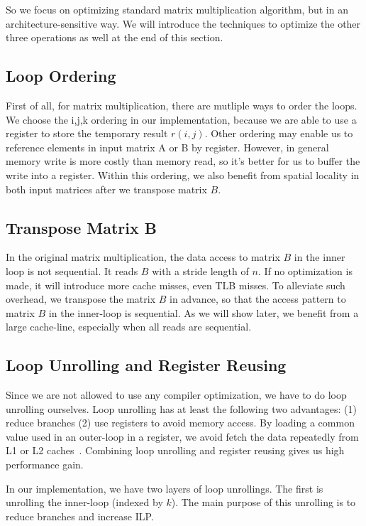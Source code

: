 \documentclass[twocolumn,letterpaper,10pt]{article}
\begin{document}
So we focus on optimizing standard matrix
multiplication algorithm, but in an architecture-sensitive way. We will introduce the techniques to
optimize the other three operations as well at the end of this
section.

\subsection{Loop Ordering}
First of all, for matrix multiplication, there are mutliple ways to order the
loops. We choose the i,j,k ordering in our implementation, because
we are able to use a register to store the temporary result
$r(i,j)$. Other ordering may enable us to reference elements in input
matrix A or B by register. However, in general memory write is more
costly than memory read, so it's better for us to buffer the
write into a register. Within this ordering, we also benefit from
spatial locality in both input matrices after we transpose matrix $B$.

\subsection{Transpose Matrix B}
In the original matrix multiplication, the data access to matrix $B$
in the inner loop is not sequential. It reads $B$ with a stride length
of $n$. If no optimization is made, it will
introduce more cache misses, even TLB misses. To alleviate such
overhead, we transpose the matrix $B$ in advance, so that the access pattern
to matrix $B$ in the inner-loop is sequential. As we will show later,
we benefit from a large cache-line, especially when all reads are sequential.

\subsection{Loop Unrolling and Register Reusing}
Since we are not allowed to use any compiler optimization, we have to
do loop unrolling ourselves. Loop unrolling has at least the following
two advantages: (1) reduce branches (2) use registers to avoid memory
access. By loading a common value used in an outer-loop in a register,
we avoid fetch the data repeatedly from L1 or L2 caches~\cite{revisited,berkeley}. Combining
loop unrolling and register reusing gives us high performance gain.

In our implementation, we have two layers of loop unrollings. The first
is unrolling the inner-loop (indexed by $k$). The main purpose of this
unrolling is to reduce branches and increase ILP.
\end{document}
